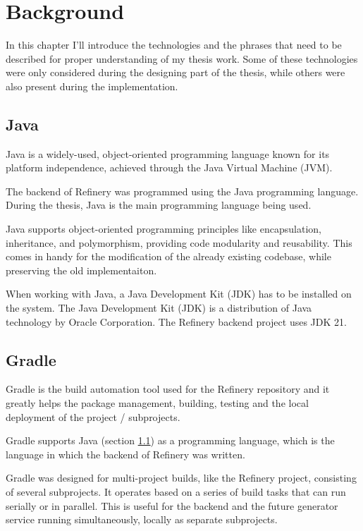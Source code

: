 \chapter{Background} \label{Background}
In this chapter I'll introduce the technologies and the phrases that need to be described for proper understanding of my thesis work.
Some of these technologies were only considered during the designing part of the thesis, while others were also present 
during the implementation.

\section{Java} \label{backgrjava}
	Java \cite{java} is a widely-used, object-oriented programming language known for its platform independence, 
	achieved through the Java Virtual Machine (JVM). 

	The backend of Refinery was programmed using the Java programming language. 
	During the thesis, Java is the main programming language being used.

	Java supports object-oriented programming principles like encapsulation, inheritance, and polymorphism, 
	providing code modularity and reusability.
	This comes in handy for the modification of the already existing codebase, while preserving the old implementaiton.

	When working with Java, a Java Development Kit (JDK) has to be installed on the system.
	The Java Development Kit (JDK) is a distribution of Java technology by Oracle Corporation. 
	The Refinery backend project uses JDK 21.

\section{Gradle} \label{backgrgradle}
	Gradle \cite{gradle} is the build automation tool used for the Refinery repository and it greatly helps the package management, 
	building, testing and the local deployment of the project / subprojects.

	Gradle supports Java (section \ref{backgrjava}) as a programming language, which is the language in which the backend of Refinery was written.

	Gradle was designed for multi-project builds, like the Refinery project, consisting of several subprojects. 
	It operates based on a series of build tasks that can run serially or in parallel. 
	This is useful for the backend and the future generator service 
	running simultaneously, locally as separate subprojects.


